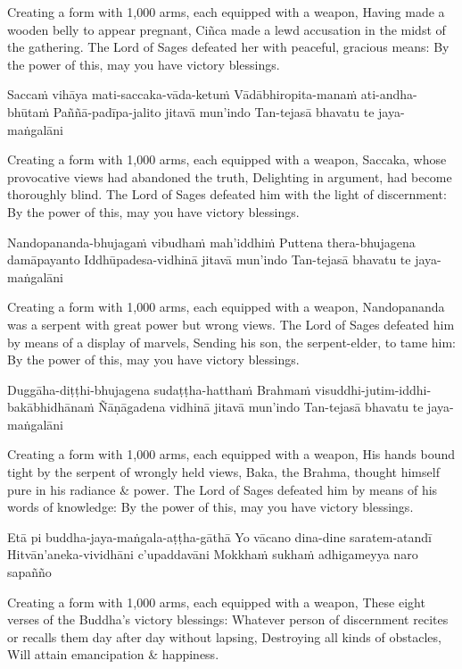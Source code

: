 \begin{english}
\begin{english}
\begin{english}
Creating a form with 1,000 arms, each equipped with a weapon,
Having made a wooden belly to appear pregnant,
Ciñca made a lewd accusation in the midst of the gathering.
The Lord of Sages defeated her with peaceful, gracious means:
By the power of this, may you have victory blessings.
\end{english}

Saccaṁ vihāya mati-saccaka-vāda-ketuṁ
Vādābhiropita-manaṁ ati-andha-bhūtaṁ
Paññā-padīpa-jalito jitavā mun’indo
Tan-tejasā bhavatu te jaya-maṅgalāni

\begin{english}
Creating a form with 1,000 arms, each equipped with a weapon,
Saccaka, whose provocative views had abandoned the truth, Delighting in argument, had become thoroughly blind.
The Lord of Sages defeated him with the light of discernment:
By the power of this, may you have victory blessings.
\end{english}

Nandopananda-bhujagaṁ vibudhaṁ mah’iddhiṁ
Puttena thera-bhujagena damāpayanto
Iddhūpadesa-vidhinā jitavā mun’indo
Tan-tejasā bhavatu te jaya-maṅgalāni

\begin{english}
Creating a form with 1,000 arms, each equipped with a weapon,
Nandopananda was a serpent with great power but wrong views.
The Lord of Sages defeated him by means of a display of marvels, Sending his son, the serpent-elder, to tame him:
By the power of this, may you have victory blessings.
\end{english}

Duggāha-diṭṭhi-bhujagena sudaṭṭha-hatthaṁ
Brahmaṁ visuddhi-jutim-iddhi-bakābhidhānaṁ
Ñāṇāgadena vidhinā jitavā mun’indo
Tan-tejasā bhavatu te jaya-maṅgalāni

\begin{english}
Creating a form with 1,000 arms, each equipped with a weapon,
His hands bound tight by the serpent of wrongly held views,
Baka, the Brahma, thought himself pure in his radiance & power.
The Lord of Sages defeated him by means of his words of knowledge:
By the power of this, may you have victory blessings.
\end{english}

Etā pi buddha-jaya-maṅgala-aṭṭha-gāthā
Yo vācano dina-dine saratem-atandī
Hitvān’aneka-vividhāni c’upaddavāni
Mokkhaṁ sukhaṁ adhigameyya naro sapañño

\begin{english}
Creating a form with 1,000 arms, each equipped with a weapon,
These eight verses of the Buddha’s victory blessings:
Whatever person of discernment recites or recalls them day after day without lapsing,
Destroying all kinds of obstacles,
Will attain emancipation \& happiness.
\end{english}


\end{english}
\end{english}

